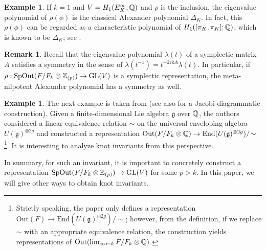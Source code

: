 \documentclass{article}
\theoremstyle{plain}
\theoremstyle{definition}
\newtheorem{exa}[thm]{Example}
\newtheorem{rem}[thm]{Remark}
\newcommand{\ra}{\rightarrow}
\newcommand{\Q}{{\Bbb Q}}
\newcommand{\Z}{{\Bbb Z}}
\newcommand{\GL}{{\rm GL}}
\begin{document}
{\begin{exa}\label{ex115}
If $k=1$ and $V=H_1( E_K^{\infty }; \Q)$ and $\rho $ is the inclusion, the eigenvalue polynomial of $\rho(\phi) $ is the classical Alexander polynomial $\Delta_K$. In fact, this $\rho(\phi) $ can be regarded as a characteristic polynomial of $H_1([\pi_K,\pi_K];\Q)$, which is known to be $\Delta_K$; see \cite[Theorem 6.17]{Lic}.
\end{exa}

\begin{rem}\label{ex125}
Recall that the eigenvalue polynomial $\lambda(t)$ of a symplectic matrix $A$ satisfies a symmetry in the sense of $\lambda(t^{-1}) = t^{-2 \mathrm{rk} A}\lambda(t) $. In particular, if $\rho: \mathrm{SpOut}(F/F_k \otimes \Z_{(p)}) \ra \GL(V)$ is a symplectic representation, the meta-nilpotent Alexander polynomial has a symmetry as well.
\end{rem}

\begin{exa}\label{ex117}The next example is taken from \cite{Co} (see also \cite{Ka} for a Jacobi-diagrammatic construction). Given a finite-dimensional Lie algebra $\mathfrak{g}$ over $\Q$, the authors considered a linear equivalence relation $\sim$ on the universal enveloping algebra $U(\mathfrak{g})^{\otimes 2g}$ and constructed a representation $ \mathrm{Out}(F /F_k\otimes \Q ) \ra \mathrm{End}(U(\mathfrak{g})^{\otimes 2g} )/\! \sim $ \footnote{Strictly speaking, the paper \cite{Co} only defines a representation $\mathrm{Out}(F) \ra \mathrm{End}(U(\mathfrak{g})^{\otimes 2g} )/ \! \sim $; however, from the definition, if we replace $\sim$ with an appropriate equivalence relation, the construction yields representations of $\mathrm{Out}(\lim_{\infty \leftarrow k} F/F_k \otimes \Q)$.}.
It is interesting to analyze knot invariants from this perspective.
\end{exa}
\noindent
In summary, for such an invariant, it is important to concretely construct a representation $ \mathrm{SpOut}(F/F_k \otimes \Z_{(p)} ) \ra \GL(V)$ for some $p>k$. In this paper, we will give other ways to obtain knot invariants. %

}
\end{document}
